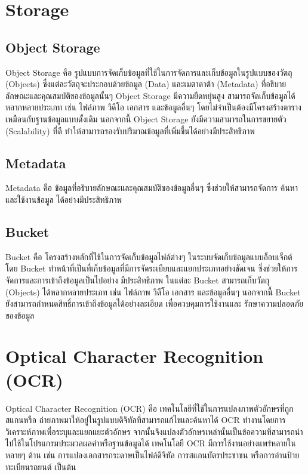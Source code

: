 \section{Storage}
  \subsection{Object Storage}
    \qquad Object Storage คือ รูปแบบการจัดเก็บข้อมูลที่ใช้ในการจัดการและเก็บข้อมูลในรูปแบบของวัตถุ (Objects)
    ซึ่งแต่ละวัตถุจะประกอบด้วยข้อมูล (Data) และเมตาดาต้า (Metadata) ที่อธิบายลักษณะและคุณสมบัติของข้อมูลนั้นๆ 
    Object Storage มีความยืดหยุ่นสูง สามารถจัดเก็บข้อมูลได้หลากหลายประเภท เช่น ไฟล์ภาพ วิดีโอ เอกสาร และข้อมูลอื่นๆ
    โดยไม่จำเป็นต้องมีโครงสร้างตารางเหมือนกับฐานข้อมูลแบบดั้งเดิม นอกจากนี้ Object Storage ยังมีความสามารถในการขยายตัว
    (Scalability) ที่ดี ทำให้สามารถรองรับปริมาณข้อมูลที่เพิ่มขึ้นได้อย่างมีประสิทธิภาพ \cite{ObjectStorage}
  \subsection{Metadata}
    \qquad Metadata คือ ข้อมูลที่อธิบายลักษณะและคุณสมบัติของข้อมูลอื่นๆ ซึ่งช่วยให้สามารถจัดการ ค้นหา และใช้งานข้อมูล
    ได้อย่างมีประสิทธิภาพ \cite{Metadata}
  \subsection{Bucket}
    \qquad Bucket คือ โครงสร้างหลักที่ใช้ในการจัดเก็บข้อมูลไฟล์ต่างๆ ในระบบจัดเก็บข้อมูลแบบอ็อบเจ็กต์ โดย Bucket
    ทำหน้าที่เป็นที่เก็บข้อมูลที่มีการจัดระเบียบและแยกประเภทอย่างชัดเจน ซึ่งช่วยให้การจัดการและการเข้าถึงข้อมูลเป็นไปอย่าง
    มีประสิทธิภาพ ในแต่ละ Bucket สามารถเก็บวัตถุ (Objects) ได้หลากหลายประเภท เช่น ไฟล์ภาพ วิดีโอ เอกสาร
    และข้อมูลอื่นๆ นอกจากนี้ Bucket ยังสามารถกำหนดสิทธิ์การเข้าถึงข้อมูลได้อย่างละเอียด เพื่อควบคุมการใช้งานและ
    รักษาความปลอดภัยของข้อมูล \cite{Bucket}

\section{Optical Character Recognition (OCR)}
  \qquad Optical Character Recognition (OCR) คือ เทคโนโลยีที่ใช้ในการแปลงภาพตัวอักษรที่ถูกสแกนหรือ
  ถ่ายภาพมาให้อยู่ในรูปแบบดิจิทัลที่สามารถแก้ไขและค้นหาได้ OCR ทำงานโดยการวิเคราะห์ภาพเพื่อระบุและแยกแยะตัวอักษร
  จากนั้นจึงแปลงตัวอักษรเหล่านั้นเป็นข้อความที่สามารถนำไปใช้ในโปรแกรมประมวลผลคำหรือฐานข้อมูลได้ 
  เทคโนโลยี OCR มีการใช้งานอย่างแพร่หลายในหลายๆ ด้าน เช่น การแปลงเอกสารกระดาษเป็นไฟล์ดิจิทัล 
  การสแกนบัตรประชาชน หรือการอ่านป้ายทะเบียนรถยนต์ เป็นต้น \cite{OCR}
